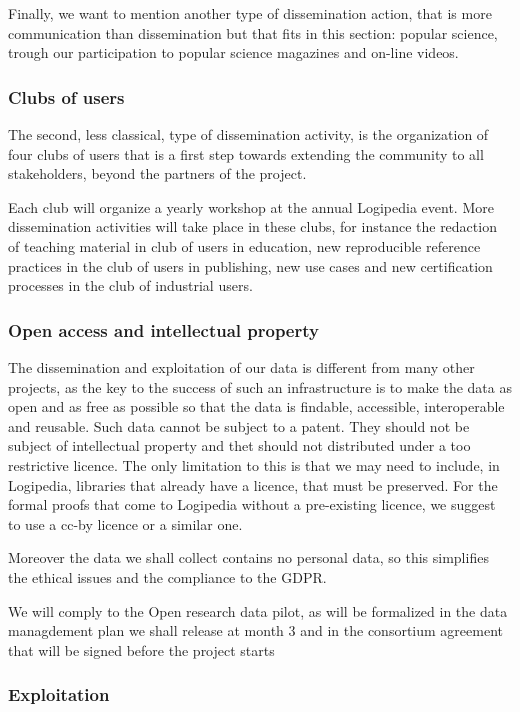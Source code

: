 Finally, we want to mention another type of dissemination action, that
is more communication than dissemination but that fits in this
section: popular science, trough our participation to popular science
magazines and on-line videos.

\subsubsection*{Clubs of users}

The second, less classical, type of dissemination activity, is the
organization of four clubs of users that is a first step towards
extending the community to all stakeholders, beyond the partners of
the project.

Each club will organize a yearly workshop at the annual Logipedia
event. More dissemination activities will take place in these clubs,
for instance the redaction of teaching material in club of users in
education, new reproducible reference practices in the club of users
in publishing, new use cases and new certification processes in the
club of industrial users.

\subsubsection*{Open access and intellectual property}

The dissemination and exploitation of our data is different from many
other projects, as the key to the success of such an infrastructure is
to make the data as open and as free as possible so that the data is
findable, accessible, interoperable and reusable. Such data cannot be
subject to a patent. They should not be subject of intellectual
property and thet should not distributed under a too restrictive
licence.  The only limitation to this is that we may need to include,
in Logipedia, libraries that already have a licence, that must be
preserved.  For the formal proofs that come to Logipedia without a
pre-existing licence, we suggest to use a cc-by licence or a similar
one.

Moreover the data we shall collect contains no personal data, so this
simplifies the ethical issues and the compliance to the GDPR.

We will comply to the Open research data pilot, as will be formalized
in the data managdement plan we shall release at month 3 and in the
consortium agreement that will be signed before the project starts

\subsubsection*{Exploitation}

